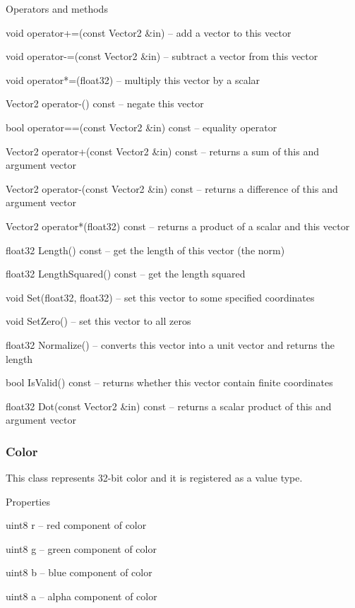 \begin{titled-itemize}{Operators and methods}
  \item void operator+=(const Vector2 \&in) -- add a vector to this vector
  \item void operator-=(const Vector2 \&in) -- subtract a vector from this vector
  \item void operator*=(float32) -- multiply this vector by a scalar
  \item Vector2 operator-() const -- negate this vector
  \item bool operator==(const Vector2 \&in) const -- equality operator
  \item Vector2 operator+(const Vector2 \&in) const -- returns a sum of this and argument vector
  \item Vector2 operator-(const Vector2 \&in) const -- returns a difference of this and argument vector
  \item Vector2 operator*(float32) const -- returns a product of a scalar and this vector
  \item float32 Length() const -- get the length of this vector (the norm)
  \item float32 LengthSquared() const -- get the length squared
  \item void Set(float32, float32) -- set this vector to some specified coordinates
  \item void SetZero() -- set this vector to all zeros
  \item float32 Normalize() -- converts this vector into a unit vector and returns the length
  \item bool IsValid() const -- returns whether this vector contain finite coordinates
  \item float32 Dot(const Vector2 \&in) const -- returns a scalar product of this and argument vector
\end{titled-itemize}

\subsubsection{Color}

This class represents 32-bit color and it is registered as a value type.

\begin{titled-itemize}{Properties}
  \item uint8 r -- red component of color
  \item uint8 g -- green component of color
  \item uint8 b -- blue component of color
  \item uint8 a -- alpha component of color
\end{titled-itemize}

